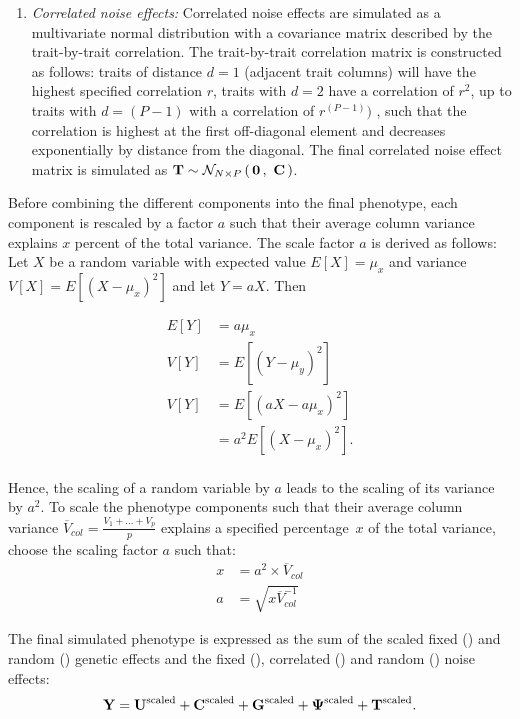 \begin{enumerate}
\item \textit{Correlated noise effects:}  Correlated noise effects are simulated as a multivariate normal distribution with a covariance matrix described by the trait-by-trait correlation. The trait-by-trait correlation matrix  is constructed as follows: traits of distance \(d=1\) (adjacent trait columns) will have the highest specified correlation \(r\), traits with \(d=2\) have a correlation of \(r^2\), up to traits with \(d=(P - 1)\) with a correlation of \(r^{(P - 1)})\) , such that the correlation is highest at the first off-diagonal element and decreases exponentially by distance from the diagonal. The final correlated noise effect matrix is simulated as \(\boldsymbol{\mathbf{T}} \sim \mathcal{N}_{N\times P}\left(\, {\boldsymbol{\mathbf{0}}} \,,~{\boldsymbol{\mathbf{C}}} \,\right)\).
\end{enumerate}

Before combining the different components into the final phenotype, each component is rescaled by a factor \(a\) such that their average column variance explains \(x\) percent of the total variance. The scale factor \(a\) is derived as follows: 
Let \(X\) be a random variable with expected value \(E[X] = \mu_{x}\) and variance \(V[X] = E[(X - \mu_{x})^2]\) and let  \(Y = aX\). Then
  
\begin{equation}
\begin{aligned}
E[Y] &= a\mu_{x} \\
V[Y] &= E[(Y - \mu_{y})^2] \\
V[Y] &= E[(aX - a\mu_{x})^2] \\
		&= a^2 E[(X - \mu_{x})^2]. \\
\end{aligned}
\end{equation}

Hence, the scaling of a random variable by \(a\) leads to the scaling of its variance by \(a^2\). To scale the phenotype components such that their average column variance \(\overline{V}_{col} = \frac{V_1 + ... + V_p}{p} \) explains a specified percentage~\(x\) of the total variance, choose the scaling factor \(a\) such that: 
\begin{equation}
\begin{aligned}
x  &= a^2 \times \overline{V}_{col} \\
a  &= \sqrt{x\overline{V}_{col}^{-1}}
\end{aligned}
\end{equation}

The final simulated phenotype   is expressed as the sum of the scaled fixed () and random () genetic effects and the fixed (), correlated () and random () noise effects:
\begin{equation}
\boldsymbol{\mathbf{Y}} = \boldsymbol{\mathbf{U}}^\text{scaled}   + \boldsymbol{\mathbf{C}}^\text{scaled} +  \boldsymbol{\mathbf{G}}^\text{scaled} +  \boldsymbol{\mathbf{\Psi}}^\text{scaled} + \boldsymbol{\mathbf{T}}^\text{scaled}.
\end{equation}

